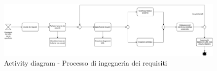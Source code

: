 \documentclass[a4paper,11pt]{article}
\begin{document}
\begin{figure}[htpb]
	\centering
	\includegraphics[width=1\textwidth]{diagrams/Activity_Diagram_-_Processo_ingegneria_dei_requisiti.pdf}
	\caption{Activity diagram - Processo di ingegneria dei requisiti}
	\label{fig:activity_diagram_-_Processo_ingegneria_dei_requisiti}
\end{figure}

\newpage


\end{document}
